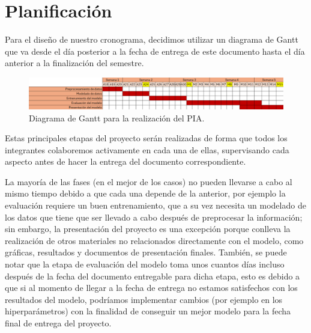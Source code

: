 \documentclass[10pt]{article}
\begin{document}
	\section{Planificación}
	Para el diseño de nuestro cronograma, decidimos utilizar un diagrama de Gantt que va desde el día posterior a la fecha de entrega de este documento hasta el día anterior a la finalización del semestre. \par
	\begin{figure}[!h]
		\centering
		\includegraphics[width=120mm]{./images/cronograma.png}
		\caption{Diagrama de Gantt para la realización del PIA.}
	\end{figure}
	Estas principales etapas del proyecto serán realizadas de forma que todos los integrantes colaboremos activamente en cada una de ellas, supervisando cada aspecto antes de hacer la entrega del documento correspondiente. \par 
	La mayoría de las fases (en el mejor de los casos) no pueden llevarse a cabo al mismo tiempo debido a que cada una depende de la anterior, por ejemplo la evaluación requiere un buen entrenamiento, que a su vez necesita un modelado de los datos que tiene que ser llevado a cabo después de preprocesar la información; sin embargo, la presentación del proyecto es una excepción porque conlleva la realización de otros materiales no relacionados directamente con el modelo, como gráficas, resultados y documentos de presentación finales. También, se puede notar que la etapa de evaluación del modelo toma unos cuantos días incluso después de la fecha del documento entregable para dicha etapa, esto es debido a que si al momento de llegar a la fecha de entrega no estamos satisfechos con los resultados del modelo, podríamos implementar cambios (por ejemplo en los hiperparámetros) con la finalidad de conseguir un mejor modelo para la fecha final de entrega del proyecto.
	
\end{document}
